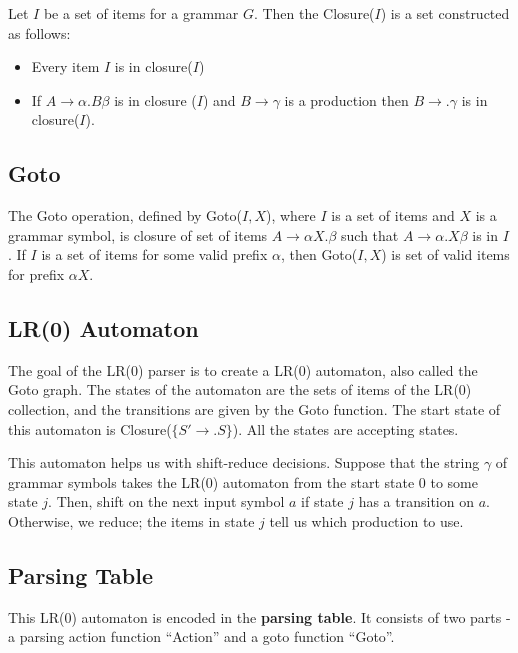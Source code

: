 \documentclass[12pt,letterpaper]{book}
\theoremstyle{definition}
\begin{document}
Let $I$ be a set of items for a grammar $G$. Then the Closure($I$) is a set constructed as follows:

\begin{itemize}
  \item Every item $I$ is in closure($I$)
  \item If $A \rightarrow \alpha . B \beta$ is in closure ($I$) and $B \rightarrow \gamma$ is a production then $B \rightarrow .\gamma$ is in closure($I$).
\end{itemize}

\subsection{Goto}

The Goto operation, defined by Goto($I,X$), where $I$ is a set of items and $X$ is a grammar symbol, is closure of set of items $A \rightarrow \alpha X. \beta$ such that $A \rightarrow \alpha . X \beta$ is in $I$. If $I$ is a set of items for some valid prefix $\alpha$, then Goto($I,X$) is set of valid items for prefix $\alpha X$. 

\subsection{LR(0) Automaton}

The goal of the LR(0) parser is to create a LR(0) automaton, also called the Goto graph. The states of the automaton are the sets of items of the LR(0) collection, and the transitions are given by the Goto function. The start state of this automaton is Closure($\{S' \rightarrow .S\}$). All the states are accepting states.

This automaton helps us with shift-reduce decisions. Suppose that the string $\gamma$ of grammar symbols takes the LR(0) automaton from the start state 0 to some state $j$. Then, shift on the next input symbol $a$ if state $j$ has a transition on $a$. Otherwise, we reduce; the items in state $j$ tell us which production to use.

\subsection{Parsing Table}

This LR(0) automaton is encoded in the \textbf{parsing table}. It consists of two parts - a parsing action function ``Action'' and a goto function ``Goto''.
\end{document}
